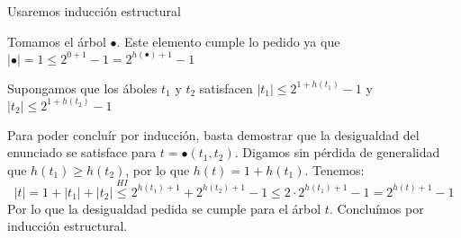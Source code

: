 Usaremos inducción estructural
\begin{CB}
    Tomamos el árbol $\bullet$. Este elemento cumple lo pedido ya que $\lvert \bullet \rvert=1\leq 2^{0+1}-1=2^{h(\bullet)+1}-1$
\end{CB}
\begin{HI}
    Supongamos que los áboles $t_1$ y $t_2$ satisfacen $\lvert t_1\rvert \leq 2^{1+h(t_1)}-1$ y $\lvert t_2\rvert \leq 2^{1+h(t_2)}-1$
\end{HI}
\begin{TI}
    Para poder concluír por inducción, basta demostrar que la desigualdad del enunciado se satisface para $t=\bullet(t_1,t_2)$. Digamos sin pérdida de generalidad que $h(t_1)\geq h(t_2)$, por lo que $h(t)=1+h(t_1)$. Tenemos:
    \[
    \lvert t \rvert = 1 +\lvert t_1\rvert+\lvert t_2 \rvert \stackrel{HI}{\leq} 2^{h(t_1)+1}+2^{h(t_2)+1}-1\leq 2\cdot 2^{h(t_1)+1}-1 = 2^{h(t)+1}-1
    \]
    Por lo que la desigualdad pedida se cumple para el árbol $t$. Concluímos por inducción estructural.
\end{TI}